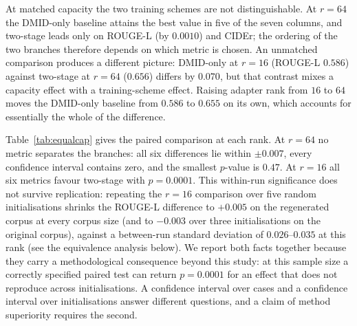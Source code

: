\documentclass{wlscirep}
\begin{document}
At matched capacity the two training schemes are not distinguishable. At $r=64$ the DMID-only baseline attains the best value in five of the seven columns, and two-stage leads only on ROUGE-L (by $0.0010$) and CIDEr; the ordering of the two branches therefore depends on which metric is chosen. An unmatched comparison produces a different picture: DMID-only at $r=16$ (ROUGE-L $0.586$) against two-stage at $r=64$ ($0.656$) differs by $0.070$, but that contrast mixes a capacity effect with a training-scheme effect. Raising adapter rank from $16$ to $64$ moves the DMID-only baseline from $0.586$ to $0.655$ on its own, which accounts for essentially the whole of the difference.

Table~\ref{tab:equalcap} gives the paired comparison at each rank. At $r=64$ no metric separates the branches: all six differences lie within $\pm 0.007$, every confidence interval contains zero, and the smallest $p$-value is $0.47$. At $r=16$ all six metrics favour two-stage with $p=0.0001$. This within-run significance does not survive replication: repeating the $r=16$ comparison over five random initialisations shrinks the ROUGE-L difference to $+0.005$ on the regenerated corpus at every corpus size (and to $-0.003$ over three initialisations on the original corpus), against a between-run standard deviation of $0.026$--$0.035$ at this rank (see the equivalence analysis below). We report both facts together because they carry a methodological consequence beyond this study: at this sample size a correctly specified paired test can return $p=0.0001$ for an effect that does not reproduce across initialisations. A confidence interval over cases and a confidence interval over initialisations answer different questions, and a claim of method superiority requires the second.
\end{document}
